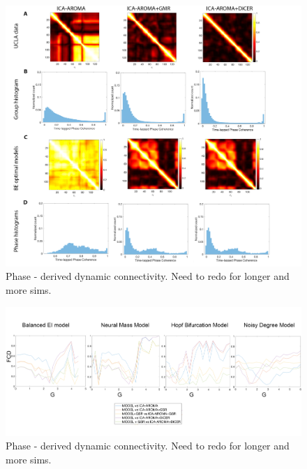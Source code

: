 \documentclass[oneside]{zHenriquesLab-StyleBioRxiv}
\begin{document}
\begin{figure}[ht!]
\includegraphics[width=1\textwidth]{figs/FCD_BEI_data.png}
\caption{Phase - derived dynamic connectivity. Need to redo for longer and more sims.}\label{fig:FCD_model_BEI}
\end{figure}

\begin{figure}[ht!]
\includegraphics[width=1\textwidth]{figs/FCD_all.png}
\caption{Phase - derived dynamic connectivity. Need to redo for longer and more sims.}\label{fig:FCD_all_fits}
\end{figure}
\end{document}
